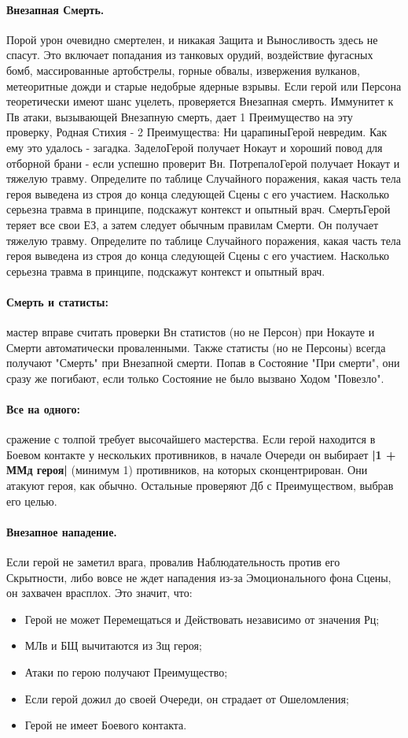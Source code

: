 \paragraph{Внезапная Смерть.} Порой урон очевидно смертелен, и никакая Защита и Выносливость здесь не спасут. Это включает попадания из танковых орудий, воздействие фугасных бомб, массированные артобстрелы, горные обвалы, извержения вулканов, метеоритные дожди и старые недобрые ядерные взрывы.
\newline Если герой или Персона теоретически имеют шанс уцелеть, проверяется  Внезапная смерть. Иммунитет к Пв атаки, вызывающей Внезапную смерть, дает 1 Преимущество на эту проверку, Родная Стихия - 2 Преимущества:
\trouble
{Ни царапины}{Герой невредим. Как ему это удалось - загадка.}
{Задело}{Герой получает Нокаут и хороший повод для отборной брани - если успешно проверит Вн.}
{Потрепало}{Герой получает Нокаут и тяжелую травму. Определите по таблице Случайного поражения, какая часть тела героя выведена из строя до конца следующей Сцены с его участием. Насколько серьезна травма в принципе, подскажут контекст и опытный врач.}
{Смерть}{Герой теряет все свои ЕЗ, а затем следует обычным правилам Смерти. Он получает тяжелую травму. Определите по таблице Случайного поражения, какая часть тела героя выведена из строя до конца следующей Сцены с его участием. Насколько серьезна травма в принципе, подскажут контекст и опытный врач.}
\paragraph{Смерть и статисты:} мастер вправе считать проверки Вн статистов (но не Персон) при Нокауте и Смерти автоматически проваленными. Также статисты (но не Персоны) всегда получают "Смерть" при Внезапной смерти. Попав в Состояние "При смерти", они сразу же погибают, если только Состояние не было вызвано Ходом "Повезло".
\paragraph{Все на одного:} сражение с толпой требует высочайшего мастерства. Если герой находится в Боевом контакте у нескольких противников, в начале Очереди он выбирает \textbf{|1 + ММд героя|} (минимум 1) противников, на которых сконцентрирован. Они атакуют героя, как обычно. Остальные проверяют Дб с Преимуществом, выбрав его целью.
\paragraph{Внезапное нападение.} Если герой не заметил врага, провалив Наблюдательность против его Скрытности, либо вовсе не ждет нападения из-за Эмоционального фона Сцены, он захвачен врасплох. Это значит, что:
\begin{itemize}
  \item Герой не может Перемещаться и Действовать независимо от значения Рц;
  \item МЛв и БЩ вычитаются из Зщ героя;
  \item Атаки по герою получают Преимущество;
  \item Если герой дожил до своей Очереди, он страдает от Ошеломления;
  \item Герой не имеет Боевого контакта.
\end{itemize}
